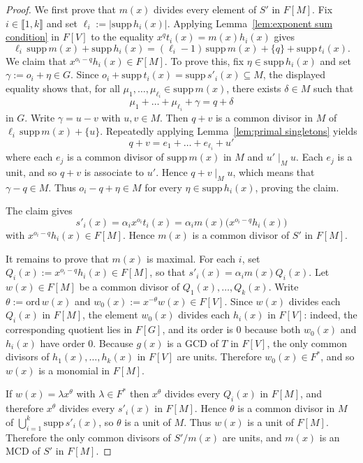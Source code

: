 \documentclass[10pt]{amsart}
\theoremstyle{definition}
\theoremstyle{remark}
\numberwithin{equation}{section}
\providecommand\ldb{\llbracket}
\providecommand\rdb{\rrbracket}
\newcommand{\ord}{\mathrm{ord}}
\begin{document}
\begin{proof}
  We first prove that $m(x)$ divides every element of $S'$ in $F[M]$. Fix $i \in \ldb 1,k \rdb$ and set $\ell_i:=|\text{supp}\,h_i(x)|$. Applying Lemma~\ref{lem:exponent sum condition} in $F[V]$ to the equality $x^qt_i(x)=m(x)h_i(x)$ gives
  \[
    \ell_i\,\text{supp}\,m(x)+\text{supp}\,h_i(x)
    = (\ell_i-1)\,\text{supp}\,m(x)+\{q\}+\text{supp}\,t_i(x).
  \]
  We claim that $x^{o_i-q}h_i(x) \in F[M]$. To prove this, fix $\eta \in \text{supp}\,h_i(x)$ and set $\gamma:=o_i+\eta \in G$. Since $o_i+\text{supp}\,t_i(x)=\text{supp}\,s'_i(x) \subseteq M$, the displayed equality shows that, for all $\mu_1,\dots,\mu_{\ell_i} \in \text{supp}\,m(x)$, there exists $\delta \in M$ such that
  \[
    \mu_1+\dots+\mu_{\ell_i}+\gamma=q+\delta
  \]
  in $G$. Write $\gamma=u-v$ with $u,v \in M$. Then $q+v$ is a common divisor in $M$ of $\ell_i\,\text{supp}\,m(x)+\{u\}$. Repeatedly applying Lemma~\ref{lem:primal singletons} yields
  \[
    q+v=e_1+\dots+e_{\ell_i}+u'
  \]
  where each $e_j$ is a common divisor of $\text{supp}\,m(x)$ in $M$ and $u' \mid_M u$. Each $e_j$ is a unit, and so $q+v$ is associate to $u'$. Hence $q+v \mid_M u$, which means that $\gamma-q \in M$. Thus $o_i-q+\eta \in M$ for every $\eta \in \text{supp}\,h_i(x)$, proving the claim.

  The claim gives
  \[
    s'_i(x)=\alpha_i x^{o_i}t_i(x)=\alpha_i m(x)\big(x^{o_i-q}h_i(x)\big)
  \]
  with $x^{o_i-q}h_i(x) \in F[M]$. Hence $m(x)$ is a common divisor of $S'$ in $F[M]$.

  It remains to prove that $m(x)$ is maximal. For each $i$, set $Q_i(x):=x^{o_i-q}h_i(x) \in F[M]$, so that $s'_i(x)=\alpha_i m(x)Q_i(x)$. Let $w(x) \in F[M]$ be a common divisor of $Q_1(x),\dots,Q_k(x)$. Write $\theta:=\ord\,w(x)$ and $w_0(x):=x^{-\theta}w(x) \in F[V]$. Since $w(x)$ divides each $Q_i(x)$ in $F[M]$, the element $w_0(x)$ divides each $h_i(x)$ in $F[V]$: indeed, the corresponding quotient lies in $F[G]$, and its order is $0$ because both $w_0(x)$ and $h_i(x)$ have order $0$. Because $g(x)$ is a GCD of $T$ in $F[V]$, the only common divisors of $h_1(x),\dots,h_k(x)$ in $F[V]$ are units. Therefore $w_0(x) \in F^*$, and so $w(x)$ is a monomial in $F[M]$.

  If $w(x)=\lambda x^\theta$ with $\lambda \in F^*$ then $x^\theta$ divides every $Q_i(x)$ in $F[M]$, and therefore $x^\theta$ divides every $s'_i(x)$ in $F[M]$. Hence $\theta$ is a common divisor in $M$ of $\bigcup_{i=1}^k \text{supp}\,s'_i(x)$, so $\theta$ is a unit of $M$. Thus $w(x)$ is a unit of $F[M]$. Therefore the only common divisors of $S'/m(x)$ are units, and $m(x)$ is an MCD of $S'$ in $F[M]$.
\end{proof}
\end{document}
